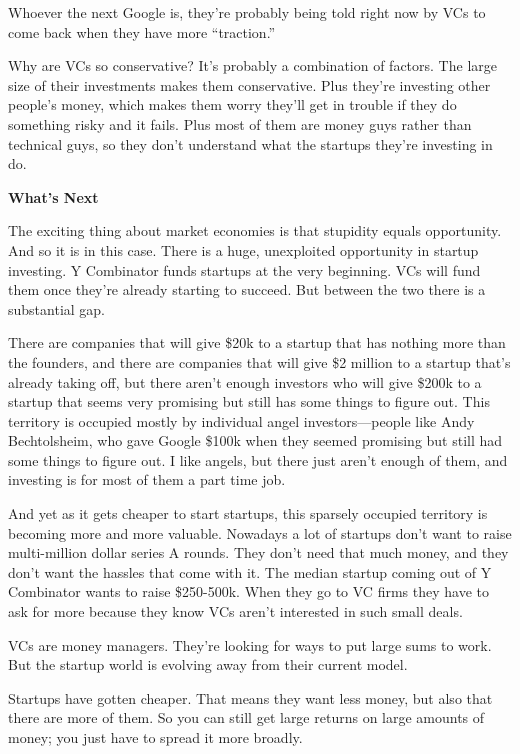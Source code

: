 \documentclass[12pt]{book}
\begin{document}
Whoever the next Google is, they're probably being told right now by VCs
to come back when they have more ``traction.''

Why are VCs so conservative? It's probably a combination of factors. The
large size of their investments makes them conservative. Plus they're
investing other people's money, which makes them worry they'll get in
trouble if they do something risky and it fails. Plus most of them are
money guys rather than technical guys, so they don't understand what the
startups they're investing in do.

\textbf{What's Next}

The exciting thing about market economies is that stupidity equals
opportunity. And so it is in this case. There is a huge, unexploited
opportunity in startup investing. Y Combinator funds startups at the
very beginning. VCs will fund them once they're already starting to
succeed. But between the two there is a substantial gap.

There are companies that will give \$20k to a startup that has nothing
more than the founders, and there are companies that will give \$2
million to a startup that's already taking off, but there aren't enough
investors who will give \$200k to a startup that seems very promising
but still has some things to figure out. This territory is occupied
mostly by individual angel investors---people like Andy Bechtolsheim,
who gave Google \$100k when they seemed promising but still had some
things to figure out. I like angels, but there just aren't enough of
them, and investing is for most of them a part time job.

And yet as it gets cheaper to start startups, this sparsely occupied
territory is becoming more and more valuable. Nowadays a lot of startups
don't want to raise multi-million dollar series A rounds. They don't
need that much money, and they don't want the hassles that come with it.
The median startup coming out of Y Combinator wants to raise \$250-500k.
When they go to VC firms they have to ask for more because they know VCs
aren't interested in such small deals.

VCs are money managers. They're looking for ways to put large sums to
work. But the startup world is evolving away from their current model.

Startups have gotten cheaper. That means they want less money, but also
that there are more of them. So you can still get large returns on large
amounts of money; you just have to spread it more broadly.
\end{document}
